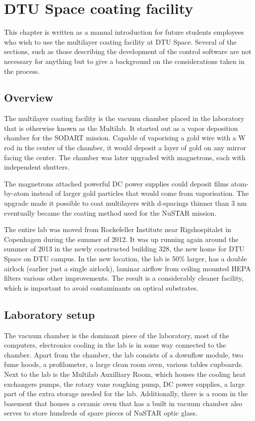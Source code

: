 \chapter{DTU Space coating facility}
This chapter is written as a manual introduction for future students employees who wish to use the multilayer coating facility at DTU Space. Several of the sections, such as those describing the development of the control software are not necessary for anything but to give a background on the considerations taken in the process.

\section{Overview}
The multilayer coating facility is the vacuum chamber placed in the laboratory that is otherwise known as the Multilab. It started out as a vapor deposition chamber for the SODART mission. Capable of vaporising a gold wire with a W rod in the center of the chamber, it would deposit a layer of gold on any mirror facing the center. The chamber was later upgraded with magnetrons, each with independent shutters.

The magnetrons attached powerful DC power supplies could deposit films atom-by-atom instead of larger gold particles that would come from vaporisation. The upgrade made it possible to coat multilayers with d-spacings thinner than 3 nm eventually became the coating method used for the NuSTAR mission.

The entire lab was moved from Rockefeller Institute near Rigshospitalet in Copenhagen during the summer of 2012. It was up running again around the summer of 2013 in the newly constructed building 328, the new home for DTU Space on DTU campus. In the new location, the lab is 50\% larger, has a double airlock (earlier just a single airlock), laminar airflow from ceiling mounted HEPA filters various other improvements. The result is a considerably cleaner facility, which is important to avoid contaminants on optical substrates.

\section{Laboratory setup}
The vacuum chamber is the dominant piece of the laboratory, most of the computers, electronics cooling in the lab is in some way connected to the chamber. Apart from the chamber, the lab consists of a downflow module, two fume hoods, a profilometer, a large clean room oven, various tables cupboards. Next to the lab is the Multilab Auxilliary Room, which houses the cooling heat exchangers pumps, the rotary vane roughing pump, DC power supplies, a large part of the extra storage needed for the lab. Additionally, there is a room in the basement that houses a ceramic oven that has a built in vacuum chamber also serves to store hundreds of spare pieces of NuSTAR optic glass.

